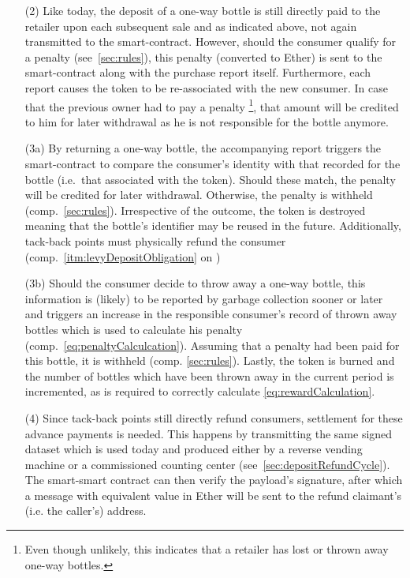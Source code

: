 \begin{itemize}
	\item [(2)] Like today, the deposit of a one-way bottle is still directly paid to the retailer upon each subsequent sale and as indicated above, not again transmitted to the smart-contract. However, should the consumer qualify for a penalty (see~\ref{sec:rules}), this penalty (converted to Ether) is sent to the smart-contract along with the purchase report itself. Furthermore, each report causes the token to be re-associated with the new consumer. In case that the previous owner had to pay a penalty \footnote{Even though unlikely, this indicates that a retailer has lost or thrown away one-way bottles.}, that amount will be credited to him for later withdrawal as he is not responsible for the bottle anymore.
	\item [(3a)] By returning a one-way bottle, the accompanying report triggers the smart-contract to compare the consumer's identity with that recorded for the bottle (i.e.~that associated with the token). Should these match, the penalty will be credited for later withdrawal. Otherwise, the penalty is withheld (comp.~\ref{sec:rules}). Irrespective of the outcome, the token is destroyed meaning that the bottle's identifier may be reused in the future. Additionally, tack-back points must physically refund the consumer (comp.~\ref{itm:levyDepositObligation} on )
	\item [(3b)] Should the consumer decide to throw away a one-way bottle, this information is (likely) to be reported by garbage collection sooner or later and triggers an increase in the responsible consumer's record of thrown away bottles which is used to calculate his penalty (comp.~\autoref{eq:penaltyCalculcation}). Assuming that a penalty had been paid for this bottle, it is withheld (comp. \ref{sec:rules}). Lastly, the token is burned and the number of bottles which have been thrown away in the current period is incremented, as is required to correctly calculate \autoref{eq:rewardCalculation}.
	\item [(4)] Since tack-back points still directly refund consumers, settlement for these advance payments is needed. This happens by transmitting the same signed dataset which is used today and produced either by a reverse vending machine or a commissioned counting center (see~\ref{sec:depositRefundCycle}). The smart-smart contract can then verify the payload's signature, after which a message with equivalent value in Ether will be sent to the refund claimant's (i.e. the caller's) address. 

\end{itemize}
